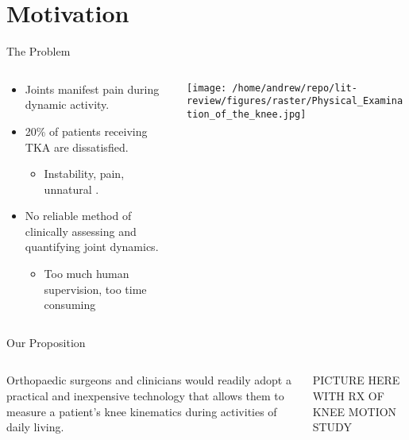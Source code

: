 \documentclass[presentation]{beamer}
\begin{document}
\section{Motivation}
\label{sec:orgbfe40f4}
\begin{frame}[label={sec:orgb8cf0ac}]{The Problem}
\begin{columns}
\begin{column}{0.5\columnwidth}
\begin{itemize}
\item Joints manifest pain during dynamic activity.
\item 20\% of patients receiving TKA are dissatisfied.
\begin{itemize}
\item Instability, pain, unnatural \autocites{bakerRolePainFunction2007}[][]{bournePatientSatisfactionTotal2010}[][]{scottPredictingDissatisfactionFollowing2010}.
\end{itemize}
\item No reliable method of clinically assessing and quantifying joint dynamics.
\begin{itemize}
\item Too much human supervision, too time consuming
\end{itemize}
\end{itemize}
\end{column}
\begin{column}{0.5\columnwidth}
\begin{center}
\texttt{[image: /home/andrew/repo/lit-review/figures/raster/Physical\_Examination\_of\_the\_knee.jpg]}
\end{center}
\end{column}
\end{columns}
\end{frame}
\begin{frame}[label={sec:orgc6626b1}]{Our Proposition}
\begin{columns}
\begin{column}{0.5\columnwidth}
Orthopaedic surgeons and clinicians would readily adopt a practical and inexpensive technology that allows them to measure a patient's knee kinematics during activities of daily living.
\end{column}
\begin{column}{0.55\columnwidth}
PICTURE HERE WITH RX OF KNEE MOTION STUDY
\end{column}
\end{columns}
\end{frame}
\end{document}

